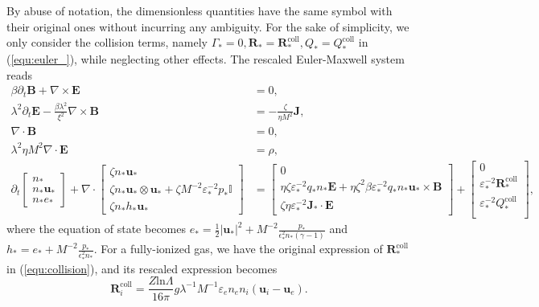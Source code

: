 \documentclass{article}
\begin{document}
By abuse of notation, the dimensionless quantities have the same symbol with their original ones without incurring any ambiguity. For the sake of simplicity, we only consider the collision terms, namely $\Gamma_* = 0, \mathbf{R}_* = \mathbf{R}_*^\text{coll}, Q_* = Q_*^\text{coll}$ in (\ref{equ:euler_}), while neglecting other effects. The rescaled Euler-Maxwell system reads
\begin{align}
    \beta \partial_t \mathbf{B} + \nabla \times \mathbf{E} &= 0, \label{equ:maxwell_faraday_rescalling} \\ 
    \lambda^2 \partial_t \mathbf{E} - \frac{\beta \lambda^2}{\xi^2}\nabla \times \mathbf{B} &= - \frac{\zeta}{\eta M^2}\mathbf{J}, \label{equ:maxwell_ampere_rescalling} \\
    \nabla \cdot \mathbf{B} &= 0,  \label{equ:maxwell_gauss_B_rescalling}\\
    \lambda^2 \eta M^2 \nabla \cdot \mathbf{E} &= \rho, \label{equ:maxwell_gauss_D_rescalling} \\
    \partial_t
    \begin{bmatrix}
    n_* \\
    n_* \mathbf{u}_* \\
    n_* e_*
    \end{bmatrix}
    + \nabla \cdot
    \begin{bmatrix}
    \zeta n_* \mathbf{u}_* \\
    \zeta n_* \mathbf{u}_* \otimes \mathbf{u}_* + \zeta M^{-2} \varepsilon_*^{-2} p_*\mathbb{I} \\
    \zeta n_* h_* \mathbf{u}_*
    \end{bmatrix}
    &=
    \begin{bmatrix}
    0 \\
    \eta \zeta \varepsilon_*^{-2} q_* n_*\mathbf{E} + \eta \zeta^2 \beta \varepsilon_*^{-2} q_* n_* \mathbf{u}_* \times \mathbf{B} \\
    \zeta \eta \varepsilon_*^{-2} \mathbf{J}_* \cdot \mathbf{E}
    \end{bmatrix} +
    \begin{bmatrix}
    0 \\
    \varepsilon_*^{-2}\mathbf{R}_*^{\text{coll}} \\
    \varepsilon_*^{-2}Q_*^{\text{coll}} \\
    \end{bmatrix}, \label{equ:euler_rescalling}
\end{align}
where the equation of state becomes $e_* = \frac{1}{2}|\mathbf{u_*}|^2 + M^{-2}\frac{p_*}{\epsilon^2_* n_* (\gamma - 1)}$ and $h_* = e_* + M^{-2}\frac{p_*}{\epsilon^2_* n_*}$. For a fully-ionized gas, we have the original expression of $\mathbf{R}_*^{\text{coll}}$ in (\ref{equ:collision}), and its rescaled expression becomes
\begin{equation*}
    \mathbf{R}_i^{\text{coll}} = \frac{Z\text{ln}\Lambda}{16\pi}g\lambda^{-1}M^{-1}\varepsilon_en_en_i(\mathbf{u}_i - \mathbf{u}_e). 
\end{equation*}
\end{document}
